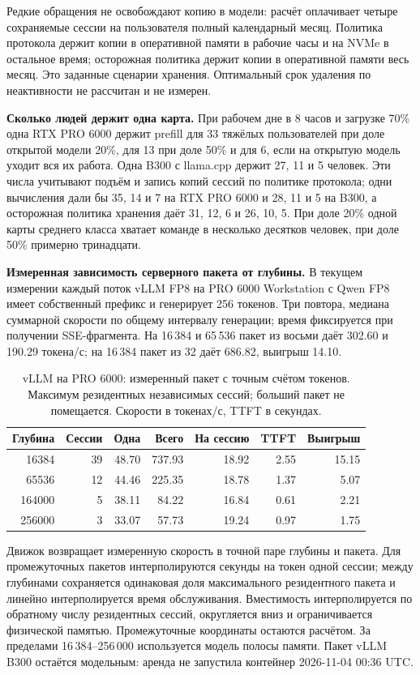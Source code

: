 Редкие обращения не освобождают копию в модели: расчёт оплачивает четыре сохраняемые сессии на пользователя
полный календарный месяц. Политика протокола держит копии в оперативной памяти в рабочие часы и на NVMe
в остальное время; осторожная политика держит копии в оперативной памяти весь месяц.
Это заданные сценарии хранения. Оптимальный срок удаления по неактивности не рассчитан и не измерен.

\textbf{Сколько людей держит одна карта.} При рабочем дне в 8 часов и загрузке 70\% одна RTX PRO 6000 держит prefill
для 33 тяжёлых пользователей при доле открытой модели 20\%, для 13 при доле 50\% и для 6, если на открытую модель
уходит вся их работа. Одна B300 с llama.cpp держит 27, 11 и 5 человек. Эти числа учитывают подъём и запись копий сессий по
политике протокола; одни вычисления дали бы 35, 14 и 7 на RTX PRO 6000 и 28, 11 и 5 на B300, а осторожная
политика хранения даёт 31, 12, 6 и 26, 10, 5. При доле 20\% одной карты среднего класса хватает команде в несколько
десятков человек, при доле 50\% примерно тринадцати.

\textbf{Измеренная зависимость серверного пакета от глубины.} В текущем измерении каждый поток vLLM FP8
на PRO 6000 Workstation с Qwen FP8 имеет собственный префикс и генерирует 256 токенов.
Три повтора, медиана суммарной скорости по общему интервалу генерации; время фиксируется при получении SSE-фрагмента.
На 16\,384 и 65\,536 пакет из восьми даёт 302.60 и 190.29 токена/с;
на 16\,384 пакет из 32 даёт 686.82, выигрыш 14.10.

\begin{table}[t]
\centering
\caption{vLLM на PRO 6000: измеренный пакет с точным счётом токенов. Максимум резидентных независимых сессий;
больший пакет не помещается. Скорости в токенах/с, TTFT в секундах.}
\label{tab:vllm-decode-depth}
\footnotesize
\begin{tabular}{rrrrrrr}
\toprule
Глубина & Сессии & Одна & Всего & На сессию & TTFT & Выигрыш \\
\midrule
16384 & 39 & 48.70 & 737.93 & 18.92 & 2.55 & 15.15 \\
65536 & 12 & 44.46 & 225.35 & 18.78 & 1.37 & 5.07 \\
164000 & 5 & 38.11 & 84.22 & 16.84 & 0.61 & 2.21 \\
256000 & 3 & 33.07 & 57.73 & 19.24 & 0.97 & 1.75 \\
\bottomrule
\end{tabular}
\end{table}

Движок возвращает измеренную скорость в точной паре глубины и пакета.
Для промежуточных пакетов интерполируются секунды на токен одной сессии; между глубинами сохраняется одинаковая доля
максимального резидентного пакета и линейно интерполируется время обслуживания.
Вместимость интерполируется по обратному числу резидентных сессий, округляется вниз и ограничивается физической памятью.
Промежуточные координаты остаются расчётом. За пределами 16\,384--256\,000 используется модель полосы памяти.
Пакет vLLM B300 остаётся модельным: аренда не запустила контейнер 2026-11-04 00:36 UTC.

